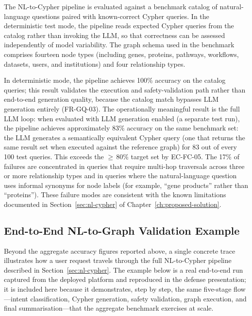 \documentclass[a4paper,noexaminfo]{sapthesis}
\begin{document}
The NL-to-Cypher pipeline is evaluated against a benchmark catalog of
natural-language questions paired with known-correct Cypher queries.  In
the deterministic test mode, the pipeline reads expected Cypher queries
from the catalog rather than invoking the LLM, so that correctness can
be assessed independently of model variability.  The graph schema used
in the benchmark comprises fourteen node types (including genes,
proteins, pathways, workflows, datasets, users, and institutions) and
four relationship types.

In deterministic mode, the pipeline achieves 100\% accuracy on the
catalog queries; this result validates the execution and safety-validation
path rather than end-to-end generation quality, because the catalog match
bypasses LLM generation entirely (FR-GQ-03).  The operationally meaningful
result is the full LLM loop: when evaluated with LLM generation enabled
(a separate test run), the pipeline achieves approximately 83\% accuracy
on the same benchmark set: the LLM generates a semantically equivalent
Cypher query (one that returns the same result set when executed against
the reference graph) for 83 out of every 100 test queries.  This
exceeds the $\geq$\,80\% target set by EC-FC-05.  The 17\% of
failures are concentrated in queries that require multi-hop traversals
across three or more relationship types and in queries where the
natural-language question uses informal synonyms for node labels (for
example, ``gene products'' rather than ``proteins'').  These failure
modes are consistent with the known limitations documented in
Section~\ref{sec:nl-cypher} of Chapter~\ref{ch:proposed-solution}.

\subsection{End-to-End NL-to-Graph Validation Example}
\label{sec:blast-version-example}

Beyond the aggregate accuracy figures reported above, a single concrete
trace illustrates how a user request travels through the full
NL-to-Cypher pipeline described in Section~\ref{sec:nl-cypher}.  The
example below is a real end-to-end run captured from the deployed
platform and reproduced in the defense presentation; it is included here
because it demonstrates, step by step, the same five-stage flow---intent
classification, Cypher generation, safety validation, graph execution,
and final summarisation---that the aggregate benchmark exercises at
scale.
\end{document}
